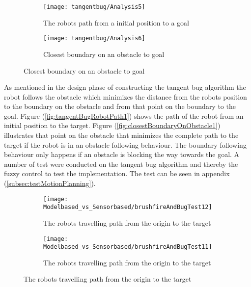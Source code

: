 \documentclass[../Head/Main.tex]{subfiles}
\begin{document}
  \begin{figure}[H]
  \begin{subfigure}[b]{0.59\textwidth}
    \centering
    \texttt{[image: tangentbug/Analysis5]}
    \caption{The robots path from a initial position to a goal}
    \label{fig:tangentBugRobotPath3}
  \end{subfigure}
  \hfill
   \begin{subfigure}[b]{0.39\textwidth}
    \centering
    \texttt{[image: tangentbug/Analysis6]}
    \caption{Closest boundary on an obstacle to goal}
    \label{fig:closestBoundaryOnObstacle3}
  \end{subfigure}
\end{figure}
  
As mentioned in the design phase of constructing the tangent bug algorithm the robot follows the obstacle which minimizes the distance from the robots position to the boundary on the obstacle and from that point on the boundary to the goal. Figure (\ref{fig:tangentBugRobotPath1}) shows the path of the robot from an initial position to the target. Figure (\ref{fig:closestBoundaryOnObstacle1}) illustrates that point on the obstacle that minimizes the complete path to the target if the robot is in an obstacle following behaviour. The boundary following behaviour only happens if an obstacle is blocking the way towards the goal. A number of test were conducted on the tangent bug algorithm and thereby the fuzzy control to test the implementation. The test can be seen in appendix (\ref{subsec:testMotionPlanning}).   

\begin{figure}[H]
	\begin{subfigure}[b]{0.49\textwidth}
    	\centering
    	\texttt{[image: Modelbased\_vs\_Sensorbased/brushfireAndBugTest12]}
    	\caption{The robots travelling path from the origin to the target}
    	\label{fig:tangentBugAnalyseTest1}
  	\end{subfigure}
    \hfill
   	\begin{subfigure}[b]{0.49\textwidth}
    	\centering
    	\texttt{[image: Modelbased\_vs\_Sensorbased/brushfireAndBugTest11]}
    	\caption{The robots travelling path from the origin to the target}
    	\label{fig:tangentBugAnalyseTest2}
  	\end{subfigure}
\end{figure}
  
\end{document}
